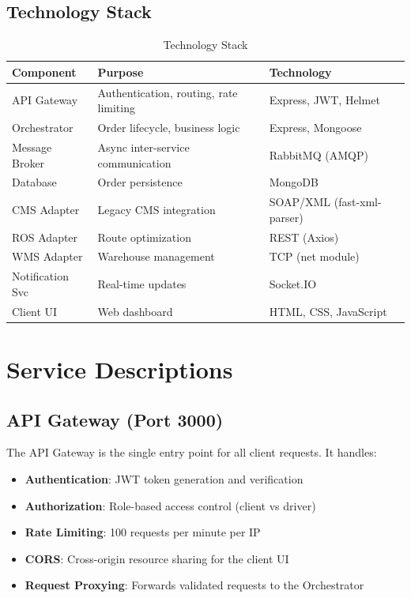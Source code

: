 \documentclass[12pt,a4paper]{article}
\begin{document}
\subsection{Technology Stack}

\begin{table}[H]
\centering
\caption{Technology Stack}
\begin{tabularx}{\textwidth}{lXl}
\toprule
\textbf{Component} & \textbf{Purpose} & \textbf{Technology} \\
\midrule
API Gateway & Authentication, routing, rate limiting & Express, JWT, Helmet \\
Orchestrator & Order lifecycle, business logic & Express, Mongoose \\
Message Broker & Async inter-service communication & RabbitMQ (AMQP) \\
Database & Order persistence & MongoDB \\
CMS Adapter & Legacy CMS integration & SOAP/XML (fast-xml-parser) \\
ROS Adapter & Route optimization & REST (Axios) \\
WMS Adapter & Warehouse management & TCP (net module) \\
Notification Svc & Real-time updates & Socket.IO \\
Client UI & Web dashboard & HTML, CSS, JavaScript \\
\bottomrule
\end{tabularx}
\end{table}

\section{Service Descriptions}

\subsection{API Gateway (Port 3000)}

The API Gateway is the single entry point for all client requests. It handles:

\begin{itemize}[leftmargin=2cm]
  \item \textbf{Authentication}: JWT token generation and verification
  \item \textbf{Authorization}: Role-based access control (client vs driver)
  \item \textbf{Rate Limiting}: 100 requests per minute per IP
  \item \textbf{CORS}: Cross-origin resource sharing for the client UI
  \item \textbf{Request Proxying}: Forwards validated requests to the Orchestrator
\end{itemize}
\end{document}
